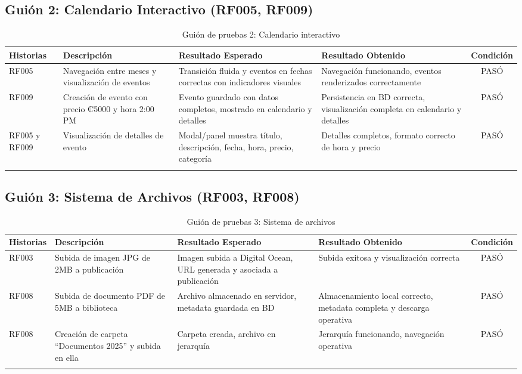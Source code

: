 \subsection{Guión 2: Calendario Interactivo (RF005, RF009)}

\begin{longtable}{ | p{2cm} | p{4cm} | p{4cm} | p{4cm} | c |}
\hline
\textbf{Historias} & \textbf{Descripción} & \textbf{Resultado Esperado} & \textbf{Resultado Obtenido} & \textbf{Condición}\\
\hline
RF005 & Navegación entre meses y visualización de eventos & Transición fluida y eventos en fechas correctas con indicadores visuales & Navegación funcionando, eventos renderizados correctamente & \color{ForestGreen}PASÓ \\
\hline
RF009 & Creación de evento con precio ₡5000 y hora 2:00 PM & Evento guardado con datos completos, mostrado en calendario y detalles & Persistencia en BD correcta, visualización completa en calendario y detalles & \color{ForestGreen}PASÓ \\
\hline
RF005 y RF009 & Visualización de detalles de evento & Modal/panel muestra título, descripción, fecha, hora, precio, categoría & Detalles completos, formato correcto de hora y precio & \color{ForestGreen}PASÓ \\
\hline
\caption{Guión de pruebas 2: Calendario interactivo}
\label{TestScript2}
\end{longtable}

\subsection{Guión 3: Sistema de Archivos (RF003, RF008)}

\begin{longtable}{ | p{2cm} | p{4cm} | p{4cm} | p{4cm} | c |}
\hline
\textbf{Historias} & \textbf{Descripción} & \textbf{Resultado Esperado} & \textbf{Resultado Obtenido} & \textbf{Condición}\\
\hline
RF003 & Subida de imagen JPG de 2MB a publicación & Imagen subida a Digital Ocean, URL generada y asociada a publicación & Subida exitosa y visualización correcta & \color{ForestGreen}PASÓ \\
\hline
RF008 & Subida de documento PDF de 5MB a biblioteca & Archivo almacenado en servidor, metadata guardada en BD & Almacenamiento local correcto, metadata completa y descarga operativa & \color{ForestGreen}PASÓ \\
\hline
RF008 & Creación de carpeta ``Documentos 2025'' y subida en ella & Carpeta creada, archivo en jerarquía & Jerarquía funcionando, navegación operativa & \color{ForestGreen}PASÓ \\
\hline
\caption{Guión de pruebas 3: Sistema de archivos}
\label{TestScript3}
\end{longtable}

